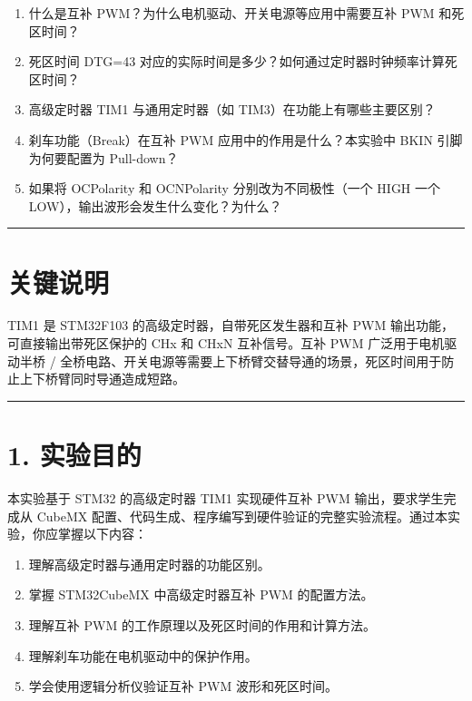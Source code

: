 \documentclass[
  chinese,
  UTF8,
  oneside,
  openany]{ctexbook}
\providecommand{\tightlist}{%
  \setlength{\itemsep}{0pt}\setlength{\parskip}{0pt}}
\begin{document}
\begin{enumerate}
\def\labelenumi{\arabic{enumi}.}
\tightlist
\item
  什么是互补 PWM？为什么电机驱动、开关电源等应用中需要互补 PWM
  和死区时间？
\item
  死区时间 DTG=43
  对应的实际时间是多少？如何通过定时器时钟频率计算死区时间？
\item
  高级定时器 TIM1 与通用定时器（如 TIM3）在功能上有哪些主要区别？
\item
  刹车功能（Break）在互补 PWM 应用中的作用是什么？本实验中 BKIN
  引脚为何要配置为 Pull-down？
\item
  如果将 OCPolarity 和 OCNPolarity 分别改为不同极性（一个 HIGH 一个
  LOW），输出波形会发生什么变化？为什么？
\end{enumerate}

\begin{center}\rule{0.5\linewidth}{0.5pt}\end{center}

\section{关键说明}\label{ux5173ux952eux8bf4ux660e-2}

TIM1 是 STM32F103 的高级定时器，自带死区发生器和互补 PWM
输出功能，可直接输出带死区保护的 CHx 和 CHxN 互补信号。互补 PWM
广泛用于电机驱动半桥 /
全桥电路、开关电源等需要上下桥臂交替导通的场景，死区时间用于防止上下桥臂同时导通造成短路。

\begin{center}\rule{0.5\linewidth}{0.5pt}\end{center}

\section{1. 实验目的}\label{ux5b9eux9a8cux76eeux7684-5}

本实验基于 STM32 的高级定时器 TIM1 实现硬件互补 PWM 输出，要求学生完成从
CubeMX
配置、代码生成、程序编写到硬件验证的完整实验流程。通过本实验，你应掌握以下内容：

\begin{enumerate}
\def\labelenumi{\arabic{enumi}.}
\tightlist
\item
  理解高级定时器与通用定时器的功能区别。
\item
  掌握 STM32CubeMX 中高级定时器互补 PWM 的配置方法。
\item
  理解互补 PWM 的工作原理以及死区时间的作用和计算方法。
\item
  理解刹车功能在电机驱动中的保护作用。
\item
  学会使用逻辑分析仪验证互补 PWM 波形和死区时间。
\end{enumerate}
\end{document}

